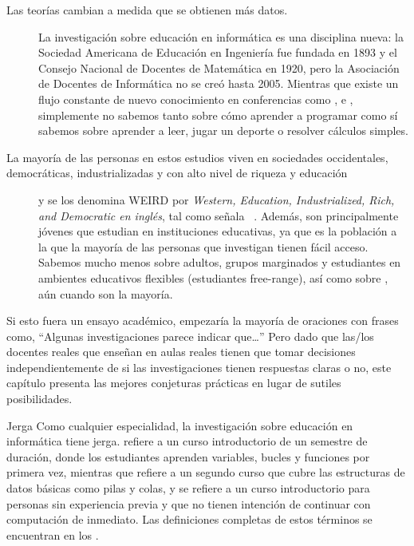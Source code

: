 \begin{description}

\item[Las teorías cambian a medida que se obtienen más datos.]
  La investigación sobre educación en informática es una disciplina nueva:
  la Sociedad Americana de Educación en Ingeniería fue fundada en 1893 y el Consejo Nacional de Docentes de Matemática en 1920, pero la Asociación de Docentes de Informática no se creó hasta 2005.
  Mientras que existe un flujo constante de nuevo conocimiento en conferencias como ,
  e ,
  simplemente no sabemos tanto sobre cómo aprender a programar como sí sabemos sobre aprender a leer, jugar un deporte o resolver cálculos simples.
 
\item[La mayoría de las personas en estos estudios
  viven en sociedades occidentales, democráticas, industrializadas y con alto nivel de riqueza y educación] y se los denomina WEIRD por \emph{Western, Education, Industrialized, Rich, and Democratic en inglés}, tal como señala ~\cite{Henr2010}.
  Además,
  son principalmente jóvenes que estudian en instituciones educativas, ya que es la población a la que la mayoría de las personas que investigan tienen fácil acceso.
  Sabemos mucho menos sobre adultos, grupos marginados y estudiantes en ambientes educativos flexibles (estudiantes free-range), así como sobre ,
  aún cuando son la mayoría.

\end{description}

Si esto fuera un ensayo académico, empezaría la mayoría de oraciones con frases como,
``Algunas investigaciones parece indicar que{\ldots}''
Pero dado que las/los docentes reales que enseñan en aulas reales tienen que tomar decisiones independientemente de si las investigaciones tienen respuestas claras o no, este capítulo presenta las mejores conjeturas prácticas en lugar de sutiles posibilidades.

\begin{aside}{Jerga}
  Como cualquier especialidad,
  la investigación sobre educación en informática tiene jerga.
   refiere a un curso introductorio de un semestre de duración, donde los estudiantes aprenden variables, bucles y funciones por primera vez, mientras que  refiere a un segundo curso que cubre las estructuras de datos básicas como pilas y colas, 
  y  se refiere a un curso introductorio para personas sin experiencia previa y que no tienen intención de continuar con computación de inmediato.
  Las definiciones completas de estos términos se encuentran en los .
\end{aside}


